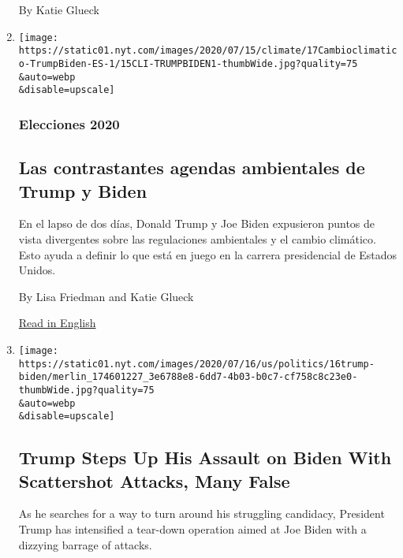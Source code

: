 \begin{enumerate}
  By Katie Glueck
\item
  \href{/es/2020/07/17/espanol/estados-unidos/cambio-climatico-trump-biden.html}{}

  \texttt{[image: https://static01.nyt.com/images/2020/07/15/climate/17Cambioclimatico-TrumpBiden-ES-1/15CLI-TRUMPBIDEN1-thumbWide.jpg?quality=75\\\&auto=webp\\\&disable=upscale]}

  \hypertarget{elecciones-2020}{%
  \subsubsection{Elecciones 2020}\label{elecciones-2020}}

  \hypertarget{las-contrastantes-agendas-ambientales-de-trump-y-biden}{%
  \subsection{Las contrastantes agendas ambientales de Trump y
  Biden}\label{las-contrastantes-agendas-ambientales-de-trump-y-biden}}

  En el lapso de dos días, Donald Trump y Joe Biden expusieron puntos de
  vista divergentes sobre las regulaciones ambientales y el cambio
  climático. Esto ayuda a definir lo que está en juego en la carrera
  presidencial de Estados Unidos.

  By Lisa Friedman and Katie Glueck

  \href{https://www.nytimes.com/2020/07/15/climate/trump-biden-environment.html}{Read
  in English}
\item
  \href{/2020/07/17/us/trump-biden-2020-election.html}{}

  \texttt{[image: https://static01.nyt.com/images/2020/07/16/us/politics/16trump-biden/merlin\_174601227\_3e6788e8-6dd7-4b03-b0c7-cf758c8c23e0-thumbWide.jpg?quality=75\\\&auto=webp\\\&disable=upscale]}

  \hypertarget{trump-steps-up-his-assault-on-biden-with-scattershot-attacks-many-false}{%
  \subsection{Trump Steps Up His Assault on Biden With Scattershot
  Attacks, Many
  False}\label{trump-steps-up-his-assault-on-biden-with-scattershot-attacks-many-false}}

  As he searches for a way to turn around his struggling candidacy,
  President Trump has intensified a tear-down operation aimed at Joe
  Biden with a dizzying barrage of attacks.


\end{enumerate}
